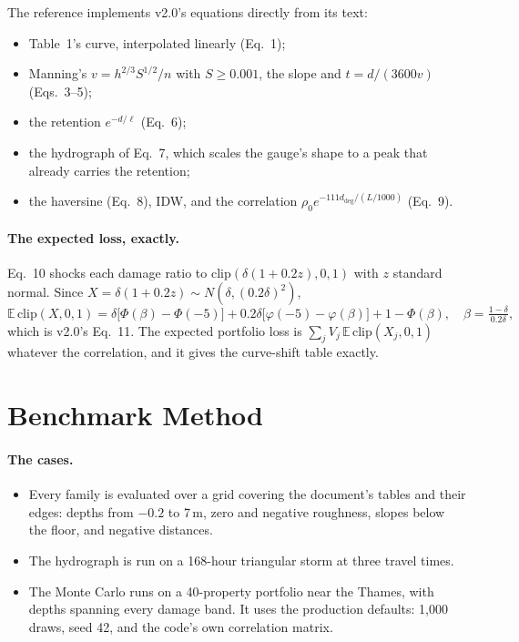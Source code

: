 \documentclass[11pt,a4paper]{article}
\begin{document}
\mkmframework

The reference implements v2.0's equations directly from its text:
\begin{itemize}[leftmargin=*,nosep]
\item Table~1's curve, interpolated linearly (Eq.~1);
\item Manning's $v=h^{2/3}S^{1/2}/n$ with $S\ge0.001$, the slope and $t=d/(3600v)$
  (Eqs.~3--5);
\item the retention $e^{-d/\ell}$ (Eq.~6);
\item the hydrograph of Eq.~7, which scales the gauge's shape to a peak that already
  carries the retention;
\item the haversine (Eq.~8), IDW, and the correlation $\rho_0e^{-111d_{\deg}/(L/1000)}$
  (Eq.~9).
\end{itemize}

\paragraph{The expected loss, exactly.} Eq.~10 shocks each damage ratio to
$\mathrm{clip}(\delta(1+0.2z),0,1)$ with $z$ standard normal. Since
$X=\delta(1+0.2z)\sim N(\delta,(0.2\delta)^2)$,
\begin{equation}
\mathbb{E}\,\mathrm{clip}(X,0,1)=\delta\bigl[\Phi(\beta)-\Phi(-5)\bigr]
+0.2\delta\bigl[\varphi(-5)-\varphi(\beta)\bigr]+1-\Phi(\beta),\quad
\beta=\tfrac{1-\delta}{0.2\delta},
\end{equation}
which is v2.0's Eq.~11. The expected portfolio loss is $\sum_jV_j\,\mathbb{E}\,
\mathrm{clip}(X_j,0,1)$ whatever the correlation, and it gives the curve-shift table
exactly.

\section{Benchmark Method}

\paragraph{The cases.}
\begin{itemize}[leftmargin=*,nosep]
\item Every family is evaluated over a grid covering the document's tables and their
  edges: depths from $-0.2$ to 7\,m, zero and negative roughness, slopes below the
  floor, and negative distances.
\item The hydrograph is run on a 168-hour triangular storm at three travel times.
\item The Monte Carlo runs on a 40-property portfolio near the Thames, with depths
  spanning every damage band. It uses the production defaults: 1{,}000 draws, seed 42,
  and the code's own correlation matrix.
\end{itemize}
\end{document}

